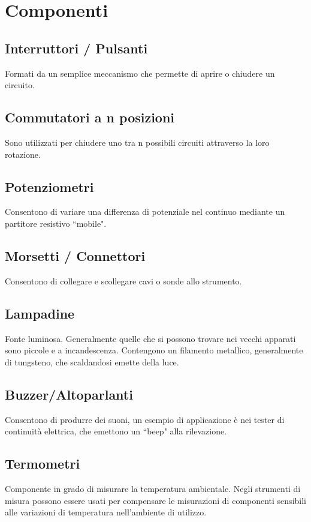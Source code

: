\documentclass[12pt,a4paper]{report}
\begin{document}
\section{Componenti}



\subsection{Interruttori / Pulsanti}
Formati da un semplice meccanismo che permette di aprire o chiudere un circuito.
\subsection{Commutatori a n posizioni}
Sono utilizzati per chiudere uno tra n possibili circuiti attraverso la loro rotazione.
\subsection{Potenziometri}
Consentono di variare una differenza di potenziale nel continuo mediante un partitore resistivo ``mobile".
\subsection{Morsetti / Connettori}
Consentono di collegare e scollegare cavi o sonde allo strumento.
\subsection{Lampadine}
Fonte luminosa. Generalmente quelle che si possono trovare nei vecchi apparati sono piccole e a incandescenza. Contengono un filamento
metallico, generalmente di tungsteno, che scaldandosi emette della luce.
\subsection{Buzzer/Altoparlanti}
Consentono di produrre dei suoni, un esempio di applicazione è nei tester di continuità elettrica, che emettono un ``beep" alla rilevazione.
\subsection{Termometri}
Componente in grado di misurare la temperatura ambientale. Negli strumenti di misura possono essere usati per compensare le misurazioni
di componenti sensibili alle variazioni di temperatura nell'ambiente di utilizzo.
\end{document}
